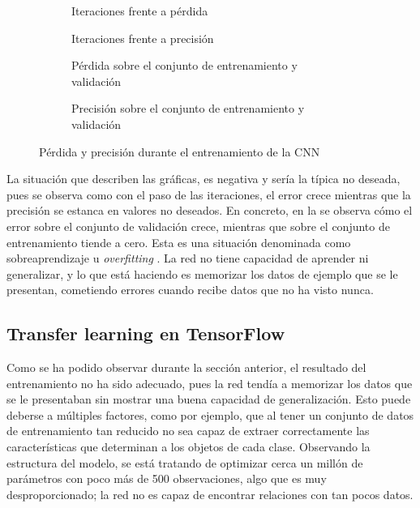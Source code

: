 			\begin{figure}[!h]
				\centering
				\begin{subfigure}{.4\textwidth}
					\centering
					
					\caption{Iteraciones frente a pérdida}
					\label{fig:tb_cnn_a}
				\end{subfigure}\hfill
				\begin{subfigure}{.4\textwidth}
					\centering
					
					\caption{Iteraciones frente a precisión}
					\label{fig:tb_cnn_b}
				\end{subfigure}
				\begin{subfigure}{.4\textwidth}
					\centering
					
					\caption{Pérdida sobre el conjunto de entrenamiento y validación}
					\label{fig:tb_cnn_c}
				\end{subfigure}\hfill
				\begin{subfigure}{.4\textwidth}
					\centering
					
					\caption{Precisión sobre el conjunto de entrenamiento y validación}
					\label{fig:tb_cnn_d}
				\end{subfigure}
				\caption{Pérdida y precisión durante el entrenamiento de la CNN}
				\label{fig:tb_cnn}
			\end{figure}
			
			La situación que describen las gráficas, es negativa y sería la típica no deseada, pues se observa como con el paso de las iteraciones, el error crece mientras que la precisión se estanca en valores no deseados. En concreto, en la  se observa cómo el error sobre el conjunto de validación crece, mientras que sobre el conjunto de entrenamiento tiende a cero. Esta es una situación denominada como sobreaprendizaje u \textit{overfitting} \cite{overfitting}. La red no tiene capacidad de aprender ni generalizar, y lo que está haciendo es memorizar los datos de ejemplo que se le presentan, cometiendo errores cuando recibe datos que no ha visto nunca. 
			
		\subsection{Transfer learning en TensorFlow}
		
			Como se ha podido observar durante la sección anterior, el resultado del entrenamiento no ha sido adecuado, pues la red tendía a memorizar los datos que se le presentaban sin mostrar una buena capacidad de generalización. Esto puede deberse a múltiples factores, como por ejemplo, que al tener un conjunto de datos de entrenamiento tan reducido no sea capaz de extraer correctamente las características que determinan a los objetos de cada clase. Observando la estructura del modelo, se está tratando de optimizar cerca un millón de parámetros con poco más de 500 observaciones, algo que es muy desproporcionado; la red no es capaz de encontrar relaciones con tan pocos datos. \\
			
